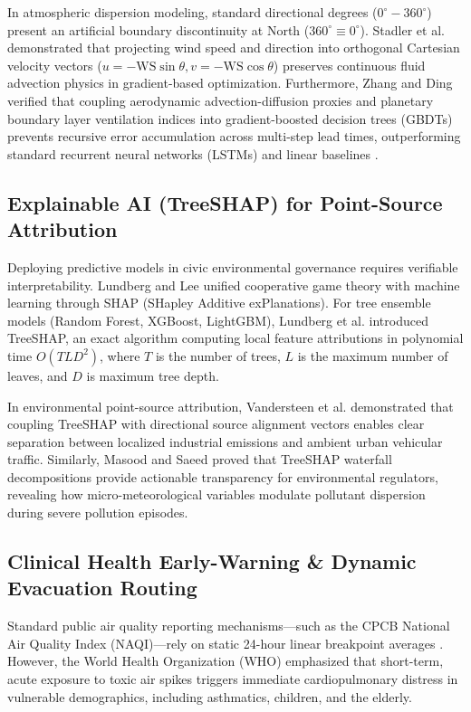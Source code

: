 \documentclass[conference]{IEEEtran}
\begin{document}
In atmospheric dispersion modeling, standard directional degrees ($0^\circ - 360^\circ$) present an artificial boundary discontinuity at North ($360^\circ \equiv 0^\circ$). Stadler et al. \cite{stadler2023physics} demonstrated that projecting wind speed and direction into orthogonal Cartesian velocity vectors ($u = -\text{WS}\sin\theta, v = -\text{WS}\cos\theta$) preserves continuous fluid advection physics in gradient-based optimization. Furthermore, Zhang and Ding \cite{zhang2022integrating} verified that coupling aerodynamic advection-diffusion proxies and planetary boundary layer ventilation indices into gradient-boosted decision trees (GBDTs) prevents recursive error accumulation across multi-step lead times, outperforming standard recurrent neural networks (LSTMs) and linear baselines \cite{ray2019urban, chen2016xgboost, ke2017lightgbm}.

\subsection{Explainable AI (TreeSHAP) for Point-Source Attribution}
Deploying predictive models in civic environmental governance requires verifiable interpretability. Lundberg and Lee \cite{lundberg2017unified} unified cooperative game theory with machine learning through SHAP (SHapley Additive exPlanations). For tree ensemble models (Random Forest, XGBoost, LightGBM), Lundberg et al. \cite{lundberg2020local} introduced TreeSHAP, an exact algorithm computing local feature attributions in polynomial time $O(T L D^2)$, where $T$ is the number of trees, $L$ is the maximum number of leaves, and $D$ is maximum tree depth. 

In environmental point-source attribution, Vandersteen et al. \cite{vandersteen2023unraveling} demonstrated that coupling TreeSHAP with directional source alignment vectors enables clear separation between localized industrial emissions and ambient urban vehicular traffic. Similarly, Masood and Saeed \cite{masood2022explainable} proved that TreeSHAP waterfall decompositions provide actionable transparency for environmental regulators, revealing how micro-meteorological variables modulate pollutant dispersion during severe pollution episodes.

\subsection{Clinical Health Early-Warning \& Dynamic Evacuation Routing}
Standard public air quality reporting mechanisms---such as the CPCB National Air Quality Index (NAQI)---rely on static 24-hour linear breakpoint averages \cite{dpcc2024}. However, the World Health Organization (WHO) \cite{who2021guidelines} emphasized that short-term, acute exposure to toxic air spikes triggers immediate cardiopulmonary distress in vulnerable demographics, including asthmatics, children, and the elderly. 
\end{document}
